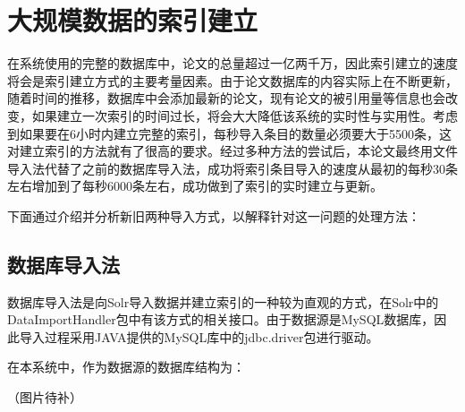 
\chapter{大规模数据的索引建立}
\label{chap:c3}

在系统使用的完整的数据库中，论文的总量超过一亿两千万，因此索引建立的速度将会是索引建立方式的主要考量因素。由于论文数据库的内容实际上在不断更新，随着时间的推移，数据库中会添加最新的论文，现有论文的被引用量等信息也会改变，如果建立一次索引的时间过长，将会大大降低该系统的实时性与实用性。考虑到如果要在6小时内建立完整的索引，每秒导入条目的数量必须要大于5500条，这对建立索引的方法就有了很高的要求。经过多种方法的尝试后，本论文最终用文件导入法代替了之前的数据库导入法，成功将索引条目导入的速度从最初的每秒30条左右增加到了每秒6000条左右，成功做到了索引的实时建立与更新。

下面通过介绍并分析新旧两种导入方式，以解释针对这一问题的处理方法：
\section{数据库导入法}
数据库导入法是向Solr导入数据并建立索引的一种较为直观的方式，在Solr中的DataImportHandler包中有该方式的相关接口。由于数据源是MySQL数据库，因此导入过程采用JAVA提供的MySQL库中的jdbc.driver包进行驱动。

在本系统中，作为数据源的数据库结构为：

（图片待补）

